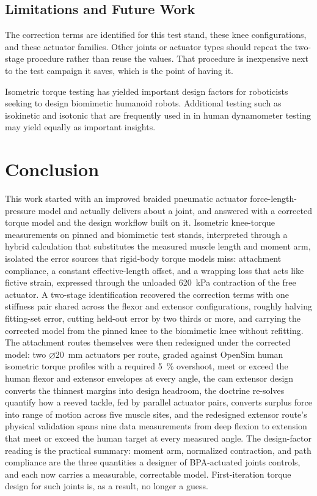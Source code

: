 \documentclass[utf8]{FrontiersinHarvard} %
\begin{document}
\subsection{Limitations and Future Work}\label{sec:limitations}

 The correction terms are identified for this test stand, these knee configurations, and these actuator families. Other joints or actuator types should repeat the two-stage procedure rather than reuse the values. That procedure is inexpensive next to the test campaign it saves, which is the point of having it.

 Isometric torque testing has yielded important design factors for roboticists seeking to design biomimetic humanoid robots. Additional testing such as isokinetic and isotonic that are frequently used in in human dynamometer testing may yield equally as important insights.

\section{Conclusion}\label{sec:conclusion}

This work started with an improved braided pneumatic actuator force-length-pressure model and actually delivers about a joint, and answered with a corrected torque model and the design workflow built on it. Isometric knee-torque measurements on pinned and biomimetic test stands, interpreted through a hybrid calculation that substitutes the measured muscle length and moment arm, isolated the error sources that rigid-body torque models miss: attachment compliance, a constant effective-length offset, and a wrapping loss that acts like fictive strain, expressed through the unloaded \qty{620}{\kPa} contraction of the free actuator. A two-stage identification recovered the correction terms with one stiffness pair shared across the flexor and extensor configurations, roughly halving fitting-set error, cutting held-out error by two thirds or more, and carrying the corrected model from the pinned knee to the biomimetic knee without refitting. The attachment routes themselves were then redesigned under the corrected model: two $\diameter$\qty{20}{\mm} actuators per route, graded against OpenSim human isometric torque profiles with a required \qty{5}{\percent} overshoot, meet or exceed the human flexor and extensor envelopes at every angle, the cam extensor design converts the thinnest margins into design headroom, the doctrine re-solves quantify how a reeved tackle, fed by parallel actuator pairs, converts surplus force into range of motion across five muscle sites, and the redesigned extensor route's physical validation spans nine data measurements from deep flexion to extension that meet or exceed the human target at every measured angle. The design-factor reading is the practical summary: moment arm, normalized contraction, and path compliance are the three quantities a designer of BPA-actuated joints controls, and each now carries a measurable, correctable model. First-iteration torque design for such joints is, as a result, no longer a guess.
\end{document}
